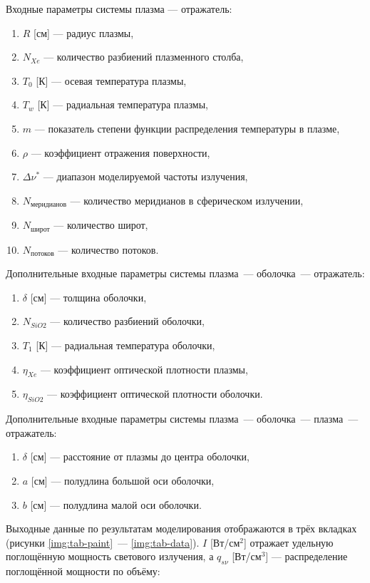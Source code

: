 Входные параметры системы плазма — отражатель:
\begin{enumerate}
	\item $R$ [см] — радиус плазмы,
	\item $N_{Xe}$ — количество разбиений плазменного столба,
	\item $T_0$ [К] — осевая температура плазмы,
	\item $T_w$ [К] — радиальная температура плазмы,
	\item $m$ — показатель степени функции распределения температуры в плазме,
	\item $\rho$ — коэффициент отражения поверхности,
	\item $\Delta\nu^*$ — диапазон моделируемой частоты излучения,
	\item $N_{\text{меридианов}}$ — количество меридианов в сферическом излучении,
	\item $N_{\text{широт}}$ — количество широт,
	\item $N_{\text{потоков}}$ — количество потоков.
\end{enumerate}

Дополнительные входные параметры системы плазма~— оболочка~— отражатель:
\begin{enumerate}
	\item $\delta$ [см] — толщина оболочки,
	\item $N_{SiO2}$ — количество разбиений оболочки,
	\item $T_1$ [К] — радиальная температура оболочки,
	\item $\eta_{Xe}$ — коэффициент оптической плотности плазмы,
	\item $\eta_{SiO2}$ — коэффициент оптической плотности оболочки.
\end{enumerate}

Дополнительные входные параметры системы плазма~— оболочка~— плазма~— отражатель:
\begin{enumerate}
	\item $\delta$ [см] — расстояние от плазмы до центра оболочки,
	\item $a$ [см] — полудлина большой оси оболочки,
	\item $b$ [см] — полудлина малой оси оболочки.
\end{enumerate}

Выходные данные по результатам моделирования отображаются в трёх вкладках (рисунки \ref{img:tab-paint}~— \ref{img:tab-data}). $I$ [Вт/см$^2$] отражает удельную поглощённую мощность светового излучения, а $q_{s\nu}$ [Вт/см$^3$] — распределение поглощённой мощности по объёму:

